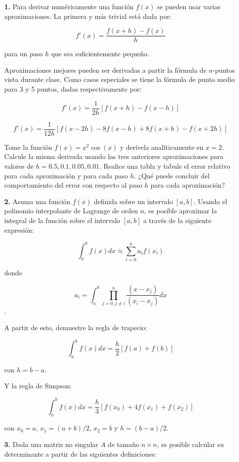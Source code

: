 \documentclass[a4,useAMS,usenatbib,usegraphicx,12pt]{article}
\begin{document}
\begin{itemize}

 \item[\textbf{1.}] 
Para derivar numéricamente una función $f(x)$ se pueden usar varias aproximaciones.
La primera y más trivial está dada por:

$$ f'(x) = \frac{f(x+h)-f(x)}{h} $$

para un paso $h$ que sea suficientemente pequeño.

Aproximaciones mejores pueden ser derivadas a partir la fórmula de $n$-puntos 
vista durante clase. Como casos especiales se tiene la fórmula de punto medio para
3 y 5 puntos, dadas respectivamente por:

$$ f'(x) = \frac{1}{2h} [ f(x+h)-f(x-h) ] $$

$$ f'(x) = \frac{1}{12h} [ f(x-2h)-8f(x-h)+8f(x+h)-f(x+2h) ] $$

Tome la función $f(x) = x^2 \cos(x)$ y derívela analíticamente en $x=2$. Calcule la
misma derivada usando las tres anteriores aproximaciones para valores de $h=0.5, 0.1, 
0.05, 0.01$. Realice una tabla y tabule el error relativo para cada aproximación
y para cada paso $h$. ¿Qué puede concluir del comportamiento del error con respecto
al paso $h$ para cada aproximación?

  \item[\textbf{2.}] Asuma una función $f(x)$ definida sobre un intervalo $[a,b]$.
Usando el polinomio interpolante de Lagrange de orden $n$, es posible aproximar la
integral de la función sobre el intervalo $[a,b]$ a través de la siguiente 
expresión:

$$ \int_a^b f(x) dx \approx \sum_{i=0}^n a_i f(x_i)  $$

donde

$$ a_i = \int_a^b \prod_{j=0,j\neq i}^n \frac{(x-x_j)}{(x_i-x_j)}dx $$.

A partir de esto, demuestre la regla de trapecio:

$$ \int_a^b f(x)dx= \frac{h}{2}[ f(a)+f(b) ] $$

con $h=b-a$.

Y la regla de Simpson:

$$ \int_a^b f(x)dx= \frac{h}{3}[ f(x_0)+4f(x_1)+f(x_2) ] $$

con $x_0=a$, $x_1 = (a+b)/2$, $x_2 =b$ y $h = (b-a)/2$.
 
 
 \item[\textbf{3.}] Dada una matriz no singular $A$ de tamaño $n\times n$, es posible
 calcular su determinante a partir de las siguientes definiciones:
 

\end{itemize}
\end{document}
